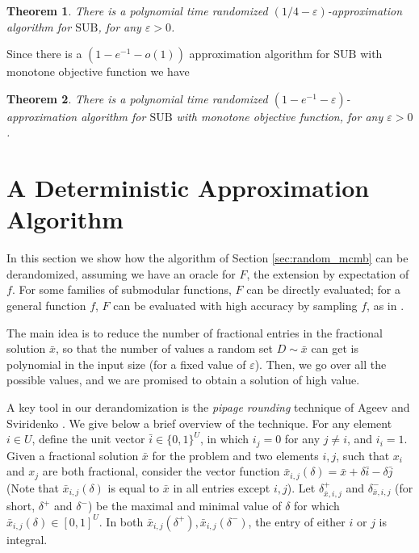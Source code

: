 \documentclass[11pt]{article}
\newtheorem{theorem}{Theorem}[section]
\newcommand{\eps}{\varepsilon}
\newcommand{\bx}{\bar{x}}
\newcommand{\SUB}{\mbox{SUB}}
\begin{document}
{\begin{theorem}
\label{thm:rand_alg_non_monotone}
There is a polynomial time randomized $(1/4-\eps)$-approximation
algorithm for $\SUB$, for any  $\eps>0$.
\end{theorem}
Since there is a $(1-e^{-1}-o(1))$ approximation algorithm for $\SUB$ with monotone objective function \cite{Vo08}
we have

\begin{theorem}
There is a polynomial time randomized $(1-e^{-1}-\eps)$-approximation
algorithm for $\SUB$ with monotone objective function, for any  $\eps>0$.
\end{theorem}




\section{A Deterministic Approximation Algorithm}
\label{mcmb:deter}
In this section we show how the
algorithm of Section \ref{sec:random_mcmb} can be derandomized,
assuming we have
an oracle for $F$, the extension by expectation of $f$.
For some families
of submodular functions, $F$ can
be directly evaluated; for a general function $f$, $F$ can be
evaluated with high accuracy by sampling $f$, as in \cite{Vo08}.

The main idea is to reduce the number of fractional entries in the
fractional solution $\bx$, so that the number of values a random set $D \sim \bx$
can get is polynomial in the input size (for a fixed value of $\eps$).
Then,
we go over all the possible values, and we are promised to obtain a solution
of high value.

A key tool in our derandomization is the \emph{pipage rounding}
technique of Ageev and Sviridenko \cite{as04}. We give below a brief overview
of the technique.
For any element $i\in U$, define the unit vector $\bar{i}\in \{0,1\}^U$, in which
${i}_j=0$
for any $j \neq i$, and ${i}_i=1$.
Given a fractional solution $\bx$ for the problem
and two elements $i,j$, such that $x_i$ and $x_j$ are both
fractional, consider the vector function
$\bx_{i,j}(\delta)= \bx + \delta \bar{i} - \delta \bar{j}$
(Note that $\bx_{i,j}(\delta)$ is equal to $\bx$ in all entries
except $i,j$).
Let $\delta_{\bx,i,j}^{+}$  and  $\delta_{\bx,i,j}^{-}$ (for short, $\delta^{+}$ and  $\delta^{-}$)
be the maximal and minimal value of $\delta$ for which $\bx_{i,j}(\delta) \in [0,1]^U$.
In both $\bx_{i,j}(\delta^{+}), \bx_{i,j}(\delta^{-})$, the entry of either $i$ or $j$ is
integral.

}
\end{document}
